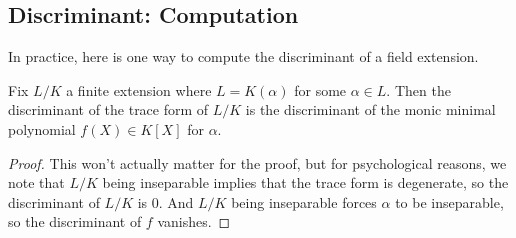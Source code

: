 \subsection{Discriminant: Computation}
In practice, here is one way to compute the discriminant of a field extension.
\begin{prop}
	Fix $L/K$ a finite extension where $L=K(\alpha)$ for some $\alpha\in L.$ Then the discriminant of the trace form of $L/K$ is the discriminant of the monic minimal polynomial $f(X)\in K[X]$ for $\alpha.$
\end{prop}
\begin{proof}
	This won't actually matter for the proof, but for psychological reasons, we note that $L/K$ being inseparable implies that the trace form is degenerate, so the discriminant of $L/K$ is $0.$ And $L/K$ being inseparable forces $\alpha$ to be inseparable, so the discriminant of $f$ vanishes.
	

\end{proof}

